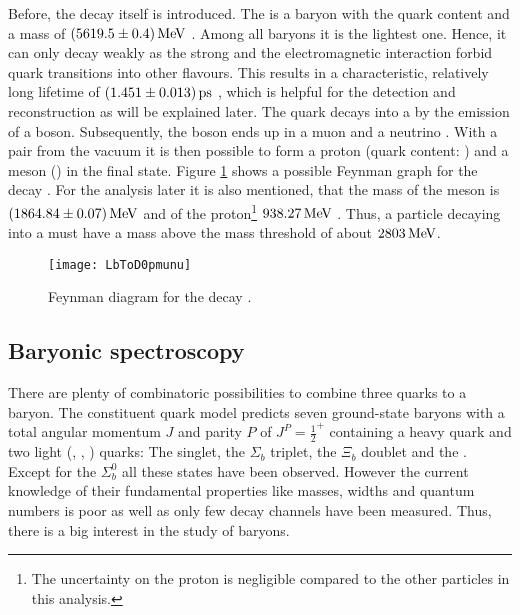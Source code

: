 Before, the decay \LbToDpmunuX itself is introduced.
The \Lb is a baryon with the quark content \uquark\dquark\bquark and a mass of $(5619.5 \pm 0.4)\mathrm{\,Me\kern -0.1em V}$ \cite{PDG}.
Among all \bquark baryons it is the lightest one.
Hence, it can only decay weakly as the strong and the electromagnetic interaction forbid quark transitions into other flavours.
This results in a characteristic, relatively long lifetime of $(1.451 \pm 0.013){\rm \,ps}$ \cite{PDG}, which is helpful for the detection and reconstruction as will be explained later.
The \bquark quark decays into a \cquark by the emission of a \Wm boson.
Subsequently, the \Wm boson ends up in a muon \mun and a neutrino \neumb.
With a \uubar pair from the vacuum it is then possible to form a proton \proton (quark content: \uquark\uquark\dquark) and a \Dz meson (\cquark\uquarkbar) in the final state.
Figure \ref{fig:LbToDpmunu} shows a possible Feynman graph for the decay \LbToDpmunu.
For the analysis later it is also mentioned, that the mass of the \Dz meson is $(1864.84 \pm 0.07)\mathrm{\,Me\kern -0.1em V}$ and of the proton\footnote{The uncertainty on the proton is negligible compared to the other particles in this analysis.} $938.27\mathrm{\,Me\kern -0.1em V}$ \cite{PDG}.
Thus, a particle decaying into a \Dz\proton must have a mass above the \Dz\proton mass threshold of about $2803\mathrm{\,Me\kern -0.1em V}$.
\begin{figure}[ptb]
    \centering
	\texttt{[image: LbToD0pmunu]}	
	\caption{Feynman diagram for the decay \LbToDpmunu.}
	\label{fig:LbToDpmunu}
\end{figure}

\subsection{Baryonic spectroscopy}
There are plenty of combinatoric possibilities to combine three quarks to a baryon.
The constituent quark model predicts seven ground-state baryons with a total angular momentum $J$ and parity $P$ of $J^P = \frac{1}{2}^+$ containing a heavy \bquark quark and two light (\uquark, \dquark, \squark) quarks: 
The \Lb singlet, the $\Sigma_b$ triplet, the $\Xi_b$ doublet and the \Omegab \cite{LHCb_Dph}.
Except for the $\Sigma_b^0$ all these states have been observed.
However the current knowledge of their fundamental properties like masses, widths and quantum numbers is poor as well as only few decay channels have been measured.
Thus, there is a big interest in the study of \bquark baryons.

